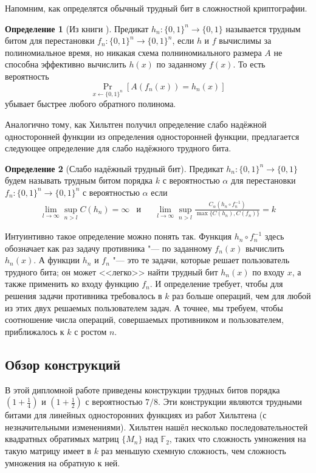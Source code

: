 \documentclass[oneside, a4paper]{article}
\theoremstyle{definition}
\newtheorem{definition}{Определение}
\theoremstyle{remark}
\newcommand\F{\ensuremath{\mathbb F}}
\begin{document}
Напомним, как определятся обычный трудный бит в сложностной криптографии.

\begin{definition}[Из книги \cite{goldreich}]
Предикат $h_n : \{0, 1\}^n \to \{0, 1\}$ называется трудным битом для
перестановки $f_n : \{0, 1\}^n \to \{0, 1\}^n$, если $h$ и $f$ вычислимы за
полиномиальное время, но никакая схема полниномиального размера $A$ не способна
эффективно вычислить $h(x)$ по заданному $f(x)$. То есть вероятность
\[
\Pr_{x \gets \{0, 1\}^n}[A(f_n(x)) = h_n(x)]
\]
убывает быстрее любого обратного полинома.
\end{definition}

Аналогично тому, как Хильтген получил определение слабо надёжной односторонней
функции из определения односторонней функции, предлагается следующее определение
для слабо надёжного трудного бита.

\begin{definition}[Слабо надёжный трудный бит]
Предикат $h_n : \{0, 1\}^n \to \{0, 1\}$ будем называть трудным битом порядка
$k$ с вероятностью $\alpha$ для перестановки $f_n : \{0, 1\}^n \to \{0, 1\}^n$ с
вероятностью $\alpha$ если
\[
\begin{aligned}
&\lim_{l \to \infty} \sup_{n > l} C(h_n) = \infty
&
\text{и}&
&
\lim_{l \to \infty} \sup_{n > l} \frac {C_\alpha(h_n \circ f_n^{-1})} {\max \{ C(h_n), C(f_n) \}} = k&
\end{aligned}
\]
\end{definition}

Интуинтивно такое определение можно понять так. Функция $h_n \circ f_n^{-1}$
здесь обозначает как раз задачу противника "--- по заданному $f_n(x)$ вычислить
$h_n(x)$. А функции $h_n$ и $f_n$ "--- это те задачи, которые решает
пользователь трудного бита; он может <<легко>> найти трудный бит $h_n(x)$ по
входу $x$, а также применить ко входу функцию $f_n$. И определение требует,
чтобы для решения задачи противника требовалось в $k$ раз больше операций, чем
для любой из этих двух решаемых пользователем задач. А точнее, мы требуем, чтобы
соотношение числа операций, совершаемых противником и пользователем,
приближалось к $k$ с ростом $n$.

\subsection{Обзор конструкций}

В этой дипломной работе приведены конструкции трудных битов порядка $(1
+ \frac 1 4)$ и $(1 + \frac 1 2)$ с вероятностью $7/8$. Эти конструкции
являются трудными битами для линейных односторонних функциях из работ Хильтгена
\cite{hiltgen1993} (с незначительными изменениями). Хильтген нашёл несколько
последовательностей квадратных обратимых матриц $\{M_n\}$ над $\F_2$, таких что
сложность умножения на такую матрицу имеет в $k$ раз меньшую схемную сложность,
чем сложность умножения на обратную к ней.
\end{document}
